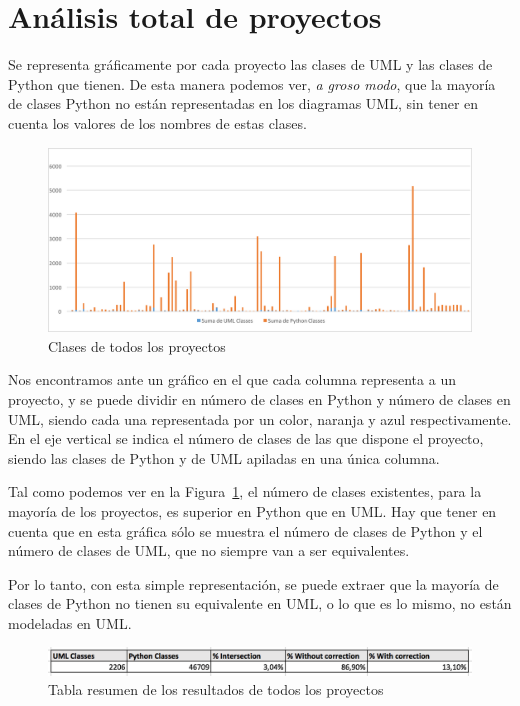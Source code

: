 \documentclass[a4paper, 12pt]{book}
\begin{document}
\section{Análisis total de proyectos}
\label{subsec:analisistotalproyectos}
Se representa gráficamente por cada proyecto las clases de UML y las clases de Python que tienen. De esta manera
podemos ver, \emph{a groso modo}, que la mayoría de clases Python no están representadas en los diagramas UML, sin tener en cuenta
los valores de los nombres de estas clases.

\begin{figure}[htb]
  \centering
  \includegraphics[width=17cm, keepaspectratio]{img/GraficasResultados/todosproyectos}
  \caption{Clases de todos los proyectos}
  \label{fig:totalproyectos}
\end{figure}

Nos encontramos ante un gráfico en el que cada columna representa a un proyecto, y se puede dividir en número de clases en Python y número de clases en UML, siendo cada una representada por un color, naranja y azul respectivamente. En el eje vertical se indica el número de clases de las que dispone el proyecto, siendo las clases de Python y de UML apiladas en una única columna.

Tal como podemos ver en la Figura~\ref{fig:totalproyectos}, el número de clases existentes, para
la mayoría de los proyectos, es superior en Python que en UML.
Hay que tener en cuenta que en esta gráfica sólo se muestra el número de clases de Python y el número
de clases de UML, que no siempre van a ser equivalentes.

Por lo tanto, con esta simple representación, se puede extraer que la mayoría de clases de Python no tienen su equivalente
en UML, o lo que es lo mismo, no están modeladas en UML.


\begin{figure}[htb]
  \centering
  \includegraphics[width=\textwidth, keepaspectratio]{img/GraficasResultados/tablatotal}
  \caption{Tabla resumen de los resultados de todos los proyectos}
  \label{fig:tablaresultados}
\end{figure}
\end{document}
